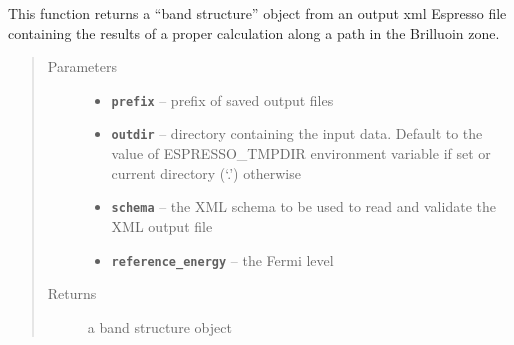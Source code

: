 \documentclass[letterpaper,10pt,english]{sphinxmanual}
\begin{document}
\begin{fulllineitems}
\label{postqe:postqe.api.get_band_structure}
This function returns a ``band structure'' object from an output xml Espresso file
containing the results of a proper calculation along a path in the Brilluoin zone.
\begin{quote}\begin{description}
\item[{Parameters}] \leavevmode\begin{itemize}
\item {} 
\textbf{\texttt{prefix}} -- prefix of saved output files

\item {} 
\textbf{\texttt{outdir}} -- directory containing the input data. Default to the value of     ESPRESSO\_TMPDIR environment variable if set or current directory (`.') otherwise

\item {} 
\textbf{\texttt{schema}} -- the XML schema to be used to read and validate the XML output file

\item {} 
\textbf{\texttt{reference\_energy}} -- the Fermi level

\end{itemize}

\item[{Returns}] \leavevmode
a band structure object

\end{description}\end{quote}

\end{fulllineitems}

\end{document}
